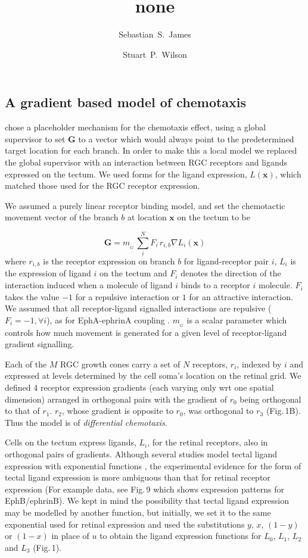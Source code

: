 \documentclass[9pt]{elife} %
\title {none}
\author[1]{Sebastian~S.~James}
\author[1*]{Stuart~P.~Wilson}
\affil[1]{Department of Psychology, The University of Sheffield, Sheffield, United Kingdom.}
\begin{document}
\subsection*{A gradient based model of chemotaxis}

\citet{simpson_simple_2011} chose a placeholder mechanism for the chemotaxis effect, using a global supervisor to set $\mathbf{G}$ to a vector which would always point to the predetermined target location for each branch.
In order to make this a local model we replaced the global supervisor with an interaction between RGC receptors and ligands expressed on the tectum. We used forms for the ligand expression, $L(\mathbf{x})$, which matched those used for the RGC receptor expression.

We assumed a purely linear receptor binding model, and set the chemotactic movement vector of the branch $b$ at location $\mathbf{x}$ on the tectum to be

\begin{equation}\label{e:G}
\mathbf{G} = m_{\!_G}\,\sum_i^N F_i\,r_{i,b} \nabla L_i(\mathbf{x})
\end{equation}
%
where $r_{i,b}$ is the receptor expression on branch $b$ for ligand-receptor pair $i$, $L_i$ is the expression of ligand $i$ on the tectum and $F_i$ denotes the direction of the interaction induced when a molecule of ligand $i$ binds to a receptor $i$ molecule.
$F_i$ takes the value $-1$ for a repulsive interaction or $1$ for an attractive interaction.
%
We assumed that all receptor-ligand signalled interactions are repulsive ($F_i=-1, \forall i$), as for EphA-ephrinA coupling \citep{drescher_vitro_1995,nakamoto_topographically_1996}.
%
$m_{\!_G}$ is a scalar parameter which controls how much movement is generated for a given level of receptor-ligand gradient signalling.

Each of the $M$ RGC growth cones carry a set of $N$ receptors, $r_i$, indexed by $i$ and expressed at levels determined by the cell soma's location on the retinal grid.
%
We defined 4 receptor expression gradients (each varying only wrt one spatial dimension) arranged in orthogonal pairs with the gradient of $r_0$ being orthogonal to that of $r_1$. $r_2$, whose gradient is opposite to $r_0$, was orthogonal to $r_3$ (Fig.\,1B). Thus the model is of \emph{differential chemotaxis}.

Cells on the tectum express ligands, $L_i$, for the retinal receptors, also in orthogonal pairs of gradients.
Although several studies model tectal ligand expression with exponential
functions \citep{koulakov_stochastic_2004}, the experimental evidence for the
form of tectal ligand expression is more ambiguous than that for retinal
receptor expression (For example data, see Fig.\,9 which shows expression patterns for EphB/ephrinB).
We kept in mind the possibility that tectal ligand expression may be modelled
by another function, but initially, we set it to the same exponential used for
retinal expression and used the substitutions $y$, $x$, $(1-y)$ or $(1-x)$ in
place of $u$ to obtain the ligand expression functions for $L_0$, $L_1$, $L_2$
and $L_3$ (Fig.\,1).


\end{document}
